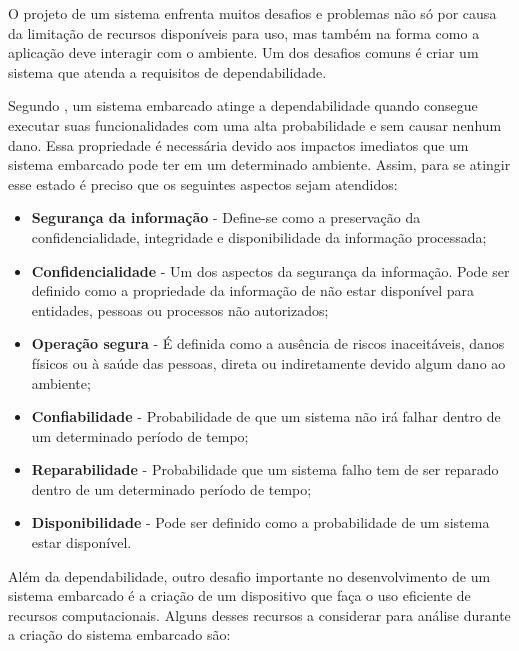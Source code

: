 O projeto de um sistema enfrenta muitos desafios e problemas não só por causa da limitação de recursos disponíveis para uso, mas também na forma como a aplicação deve interagir com o ambiente. Um dos desafios comuns é criar um sistema que atenda a requisitos de dependabilidade.

Segundo , um sistema embarcado atinge a dependabilidade quando consegue executar suas funcionalidades com uma alta probabilidade e sem causar nenhum dano. Essa propriedade é necessária devido aos impactos imediatos que um sistema embarcado pode ter em um determinado ambiente. Assim, para se atingir esse estado é preciso que os seguintes aspectos sejam atendidos:

\begin{itemize}

    \item \textbf{Segurança da informação} - Define-se como a preservação da confidencialidade, integridade e disponibilidade da informação processada;
    
    \item \textbf{Confidencialidade} - Um dos aspectos da segurança da informação. Pode ser definido como a propriedade da informação de não estar disponível para entidades, pessoas ou processos não autorizados;
    
    \item \textbf{Operação segura} - É definida como a ausência de riscos inaceitáveis, danos físicos ou à saúde das pessoas, direta ou indiretamente devido algum dano ao ambiente;
    
    \item \textbf{Confiabilidade} - Probabilidade de que um sistema não irá falhar dentro de um determinado período de tempo;
    
    \item \textbf{Reparabilidade} - Probabilidade que um sistema falho tem de ser reparado dentro de um determinado período de tempo;
    
    \item \textbf{Disponibilidade} - Pode ser definido como a probabilidade de um sistema estar disponível.
    
    
\end{itemize}

\newpage

Além da dependabilidade, outro desafio importante no desenvolvimento de um sistema embarcado é a criação de um dispositivo que faça o uso eficiente de recursos computacionais. Alguns desses recursos a considerar para análise durante a criação do sistema embarcado são:

